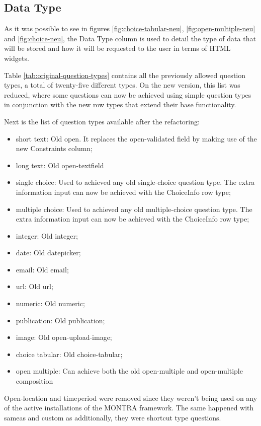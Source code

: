 \subsection*{Data Type}

As it was possible to see in figures \ref{fig:choice-tabular-neu}, \ref{fig:open-multiple-neu} and \ref{fig:choice-neu}, the Data Type column is used to detail the type of data that will be stored and how it will be requested to the user in terms of HTML widgets.

Table \ref{tab:original-question-types} contains all the previously allowed question types, a total of twenty-five different types.
On the new version, this list was reduced, where some questions can now be achieved using simple question types in conjunction with the new row types that extend their base functionality.

Next is the list of question types available after the refactoring:

\begin{itemize}
    \item short text: Old open. It replaces the open-validated field by making use of the new Constraints column;
    \item long text: Old open-textfield
    \item single choice: Used to achieved any old single-choice question type. The extra information input can now be achieved with the ChoiceInfo row type;
    \item multiple choice: Used to achieved any old multiple-choice question type. The extra information input can now be achieved with the ChoiceInfo row type;
    \item integer: Old integer;
    \item date: Old datepicker;
    \item email: Old email;
    \item url: Old url;
    \item numeric: Old numeric;
    \item publication: Old publication;
    \item image: Old open-upload-image;
    \item choice tabular: Old choice-tabular;
    \item open multiple: Can achieve both the old open-multiple and open-multiple composition
\end{itemize}

Open-location and timeperiod were removed since they weren't being used on any of the active installations of the MONTRA framework.
The same happened with sameas and custom as additionally, they were shortcut type questions.

